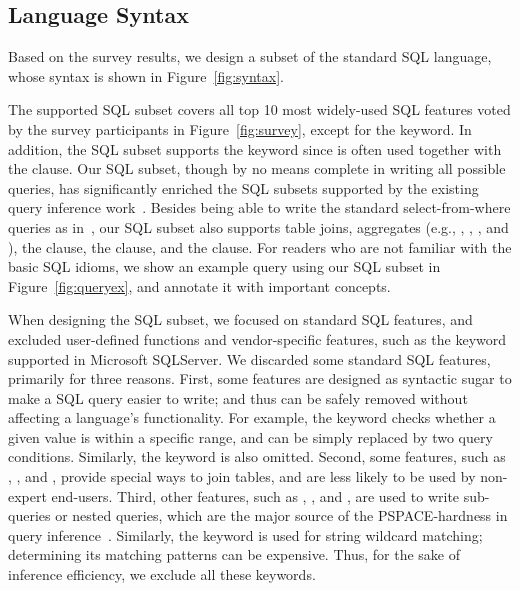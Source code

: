 \subsection{Language Syntax}
\label{sec:syntax}

Based on the survey results, we design a subset
of the standard SQL language, whose
syntax is shown in Figure~\ref{fig:syntax}.


The supported SQL subset covers all top 10 most widely-used SQL
features voted by the survey participants
in Figure~\ref{fig:survey}, except for the  keyword.
In addition, the SQL subset supports the 
keyword since  is often used together with the  clause.
Our SQL subset, though by no means complete in writing all
possible queries, has significantly
enriched the SQL subsets supported by the existing query inference
work~\cite{DasSarma:2010, Tran:2009}. Besides being able to write the
standard select-from-where queries as in~\cite{DasSarma:2010, Tran:2009},
our SQL subset also supports table joins, aggregates
(e.g., , , , and ),
the  clause, the  clause,
and the  clause. For readers who are not
familiar with the basic SQL idioms, we show an example query
using our SQL subset in Figure~\ref{fig:queryex}, and annotate
it with important concepts.


When designing the SQL subset, we focused on standard
SQL features, and excluded user-defined functions and
vendor-specific features, such as the 
keyword supported in Microsoft SQLServer. 
We discarded some standard SQL features, primarily for
three reasons. First, some features are designed
as syntactic sugar to make a SQL query easier to write;
and thus can be safely removed without affecting a language's
functionality. For example, the 
keyword checks whether a given value is within a specific
range, and can be simply replaced by two query conditions.
Similarly, the  keyword is also omitted.
Second, some features, such as 
, , and ,
provide special ways to join tables, and are less likely to be
used by non-expert end-users.
Third, other features, such as , , and ,
are used to write sub-queries or nested queries, which are the major source
of the PSPACE-hardness in query inference~\cite{DasSarma:2010}.
Similarly, the  keyword is used for string
wildcard matching; determining its matching
patterns can be expensive. Thus, 
for the sake of inference efficiency, we exclude all these keywords.

